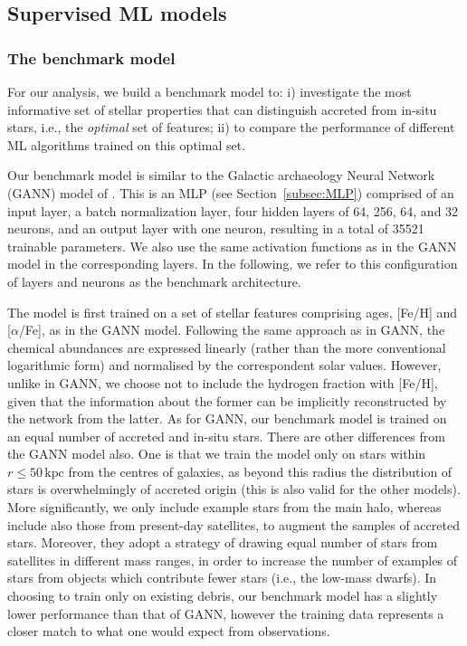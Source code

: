 \subsection{Supervised ML models}
\label{subsec:models}

\subsubsection{The benchmark model}
\label{subsec:benchmark}

For our analysis, we build a benchmark model to: i) investigate the most informative set of stellar properties that can distinguish accreted from in-situ stars, i.e., the \textit{optimal} set of features; ii) to compare the performance of different ML algorithms trained on this optimal set.

Our benchmark model is similar to the Galactic archaeology Neural Network (GANN) model of \citet{Tronrud2022}. This is an MLP (see Section~\ref{subsec:MLP}) comprised of an input layer, a batch normalization layer, four hidden layers of 64, 256, 64, and 32 neurons, and an output layer with one neuron, resulting in a total of 35521 trainable parameters. We also use the same activation functions as in the GANN model in the corresponding layers. In the following, we refer to this configuration of layers and neurons as the benchmark architecture.

The model is first trained on a set of stellar features comprising ages, [Fe/H] and [$\alpha$/Fe], as in the GANN model. Following the same approach as in GANN, the chemical abundances are expressed linearly (rather than the more conventional logarithmic form) and normalised by the correspondent solar values. However, unlike in GANN, we choose not to include the hydrogen fraction with [Fe/H], given that the information about the former can be implicitly reconstructed by the network from the latter. As for GANN, our benchmark model is trained on an equal number of accreted and in-situ stars. There are other differences from the GANN model also. One is that we train the model only on stars within $r\leq 50\, \textrm{kpc}$ from the centres of galaxies, as beyond this radius the distribution of stars is overwhelmingly of accreted origin (this is also valid for the other models). More significantly, we only include example stars from the main halo, whereas \citet{Tronrud2022} include also those from present-day satellites, to augment the samples of accreted stars. Moreover, they adopt a strategy of drawing equal number of stars from satellites in different mass ranges, in order to increase the number of examples of stars from objects which contribute fewer stars (i.e., the low-mass dwarfs). In choosing to train only on existing debris, our benchmark model has a slightly lower performance than that of GANN, however the training data  represents a closer match to what one would expect from observations.

